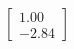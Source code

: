 \documentclass[preview]{standalone}
\begin{document}
\begin{align*}
\begin{bmatrix} 1.00 \\ -2.84 \end{bmatrix}
\end{align*}
\end{document}
